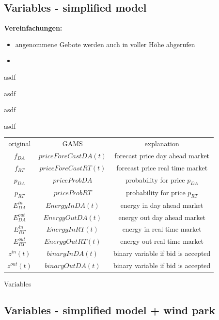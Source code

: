 \documentclass{article}
\begin{document}
\subsection{Variables - simplified model}
\textbf{Vereinfachungen:}
\begin{itemize}
    \item angenommene Gebote werden auch in voller Höhe abgerufen
    \item 
\end{itemize}

asdf


asdf


asdf


asdf




    \centering
    \begin{tabular}{c|c|c}
            original & GAMS & explanation \\
         $f_{DA}$ & $priceForeCastDA(t)$ & forecast price day ahead market\\
         $f_{RT}$ & $priceForeCastRT(t)$ &  forecast price real time market\\

         $p_{DA}$ & $ priceProbDA $ & probability for price $p_{DA}$ \\
         $p_{RT}$ & $ priceProbRT $ & probability for price $p_{RT}$ \\
         
         $E^{in}_{DA}$ & $EnergyInDA(t)$ & energy in day ahead market \\
         $E^{out}_{DA}$ & $EnergyOutDA(t)$ & energy out day ahead market \\

         $E^{in}_{RT}$ & $EnergyInRT(t)$ & energy in real time market \\
         $E^{out}_{RT}$ & $EnergyOutRT(t)$ & energy out  real time market \\

         $z^{in}(t)$ & $binaryInDA(t)$ & binary variable if bid is accepted\\
         $z^{out}(t)$ & $binaryOutDA(t)$ & binary variable if bid is accepted\\


    \end{tabular}
    \caption{Variables}
    \label{tab:my_label}





\subsection{Variables - simplified model + wind park}
\end{document}
